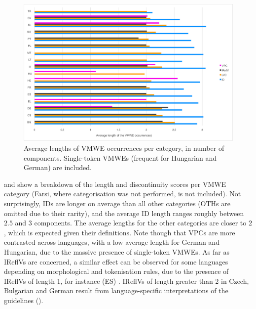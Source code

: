 \documentclass[output=paper,modfonts]{langscibook}
\begin{document}
\begin{figure}
\centering
\includegraphics[width=1.0\textwidth]{figures/parseme-st-2017-BOOK-CORPUS-chart-length.png}
\caption{Average lengths of VMWE occurrences %
per category, %
in number of %
components. 
Single-token VMWEs (frequent for Hungarian and German) are included.} %
\label{fig:lengths-per-category}
\end{figure}

 and  show a breakdown of the length and discontinuity scores per VMWE category (Farsi, where categorisation was not performed, is not included). Not surprisingly, %
IDs are longer on average than all other categories (OTHs are omitted due to their rarity), and the average ID length ranges roughly between $2.5$ and $3$ components. The average lengths for the other categories are closer to $2$, which is expected given their definitions. Note though that VPCs are more contrasted across languages, with a low average length for German and Hungarian, due to the massive presence of single-token VMWEs. As far as IReflVs are concerned, a similar effect can be observed for some languages depending on morphological and tokenisation rules, due to the presence of IReflVs of length 1, for instance (ES) . IReflVs of length greater than 2 in Czech, Bulgarian and German result from language-specific interpretations of the guidelines ().
\end{document}
